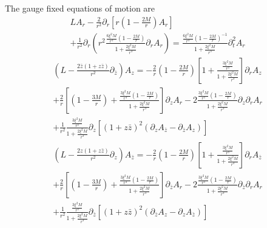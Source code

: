 \documentclass[12pt]{article}
\def\nn{\nonumber}
\begin{document}
The gauge fixed equations of motion are
\begin{gather}
L A_{r}
-
\frac{2}{r^{2}}
\partial_{r}
\left[
r
(1 - \frac{2 M}{r})
A_{r}
\right]
\nn \\
+
\frac{1}{r^{2}}
\partial_{r}
\left(
r^{2}
\frac{\frac{6 \xi^{2} M}{r^{3}} (1 - \frac{2 M}{r})}{1 + \frac{2 \xi^{2} M}{r^{3}}}
\partial_{r} A_{r}
\right)
=
\frac{\frac{6 \xi^{2} M}{r^{3}} (1 - \frac{2 M}{r})^{-1}}{1 + \frac{2 \xi^{2} M}{r^{3}}}
\partial_{t}^{2} A_{r} 
\end{gather}
\begin{gather}
\left(L
-
\frac{2 \bar{z} (1 + z \bar{z})}{r^{2}}
\partial_{\bar{z}}
\right)
A_{z}
=
-
\frac{2}{r}
(1 - \frac{2 M}{r})
\left[
1
+
\frac{\frac{3 \xi^{2} M}{r^{3}}}{1 + \frac{2 \xi^{2} M}{r^{3}}}
\right]
\partial_{r} A_{z} 
\nn \\
+
\frac{2}{r}
\left[
(1 - \frac{3 M}{r})
+
\frac{\frac{3 \xi^{2} M}{r^{3}} (1 - \frac{2 M}{r}) }{1 + \frac{2 \xi^{2} M}{r^{3}}}
\right]
\partial_{z} A_{r}
-
2
\frac{\frac{3 \xi^{2} M}{r^{3}} (1 - \frac{2 M}{r})}{1 + \frac{2 \xi^{2} M}{r^{3}}}
\partial_{z}
\partial_{r}
A_{r}
\nn \\
+
\frac{1}{r^{2}}
\frac{\frac{3 \xi^{2} M}{r^{3}} }{1 + \frac{2 \xi^{2} M}{r^{3}}}
\partial_{z}
\left[
(1 + z \bar{z})^{2}
\left(
\partial_{z}A_{\bar{z}}
-
\partial_{\bar{z}} A_{z}
\right)
\right]
\end{gather}
\begin{gather}
\left(L
-
\frac{2 z (1 + z \bar{z})}{r^{2}}
\partial_{z}
\right)
A_{\bar{z}}
=
-
\frac{2}{r}
(1 - \frac{2 M}{r})
\left[
1
+
\frac{\frac{3 \xi^{2} M}{r^{3}}}{1 + \frac{2 \xi^{2} M}{r^{3}}}
\right]
\partial_{r} A_{\bar{z}} 
\nn \\
+
\frac{2}{r}
\left[
(1 - \frac{3 M}{r})
+
\frac{\frac{3 \xi^{2} M}{r^{3}} (1 - \frac{2 M}{r}) }{1 + \frac{2 \xi^{2} M}{r^{3}}}
\right]
\partial_{\bar{z}} A_{r}
-
2
\frac{\frac{3 \xi^{2} M}{r^{3}} (1 - \frac{2 M}{r})}{1 + \frac{2 \xi^{2} M}{r^{3}}}
\partial_{\bar{z}}
\partial_{r}
A_{r}
\nn \\
+
\frac{1}{r^{2}}
\frac{\frac{3 \xi^{2} M}{r^{3}} }{1 + \frac{2 \xi^{2} M}{r^{3}}}
\partial_{\bar{z}}
\left[
(1 + z \bar{z})^{2}
\left(
\partial_{\bar{z}} A_{z}
-
\partial_{z}A_{\bar{z}}
\right)
\right]
\end{gather}
\end{document}

